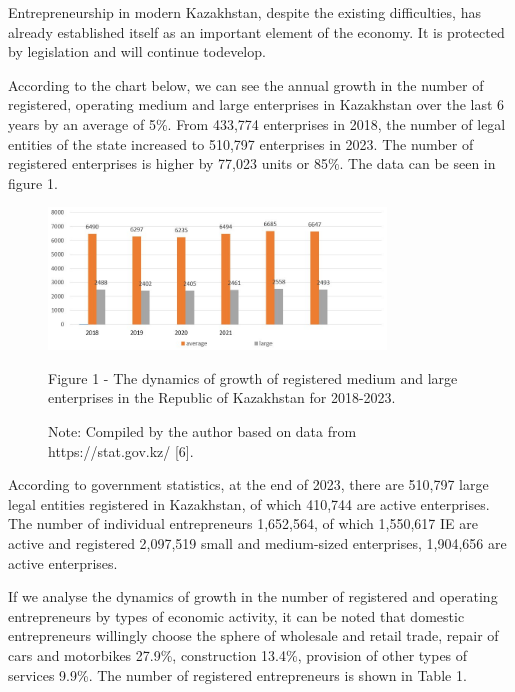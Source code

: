 \begin{multicols}{2}
Entrepreneurship in modern Kazakhstan, despite the existing
difficulties, has already established itself as an important element of
the economy. It is protected by legislation and will continue todevelop.

According to the chart below, we can see the annual growth in the number
of registered, operating medium and large enterprises in Kazakhstan over
the last 6 years by an average of 5\%. From 433,774 enterprises in 2018,
the number of legal entities of the state increased to 510,797
enterprises in 2023. The number of registered enterprises is higher by
77,023 units or 85\%. The data can be seen in figure 1.
\end{multicols}

\begin{figure}[H]
	\centering
	\includegraphics[width=0.8\textwidth]{media/ekon/image2.1}
	\caption*{Figure 1 - The dynamics of growth of registered medium and large
  enterprises in the Republic of Kazakhstan for 2018-2023.}
	\caption*{Note: Compiled by the author based on data from
  https://stat.gov.kz/ {[}6{]}.}
\end{figure}

\begin{multicols}{2}

According to government statistics, at the end of 2023, there are
510,797 large legal entities registered in Kazakhstan, of which 410,744
are active enterprises. The number of individual entrepreneurs
1,652,564, of which 1,550,617 IE are active and registered 2,097,519
small and medium-sized enterprises, 1,904,656 are active enterprises.

If we analyse the dynamics of growth in the number of registered and
operating entrepreneurs by types of economic activity, it can be noted
that domestic entrepreneurs willingly choose the sphere of wholesale and
retail trade, repair of cars and motorbikes 27.9\%, construction 13.4\%,
provision of other types of services 9.9\%. The number of registered
entrepreneurs is shown in Table 1.
\end{multicols}

